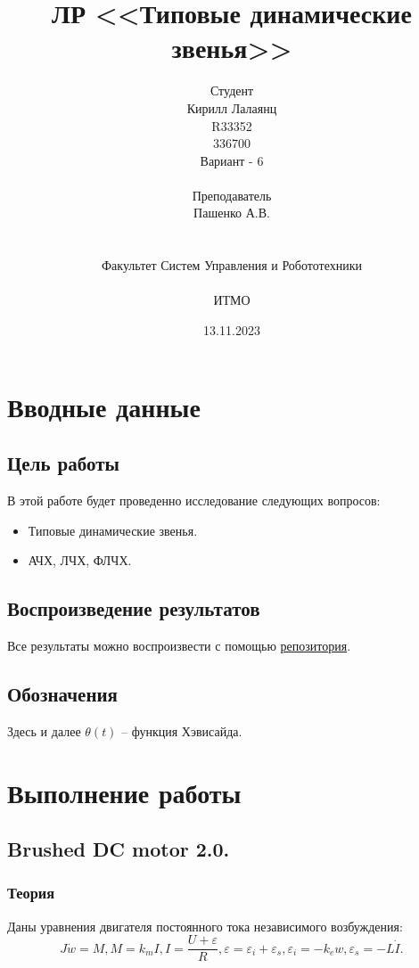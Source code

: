 \documentclass[16pt]{article}
\title{ЛР \textnumero 5 <<Типовые динамические звенья>>}
\author{
Студент \\
Кирилл Лалаянц\\
R33352\\
336700\\
Вариант - 6\\
\\
Преподаватель\\
Пашенко А.В. \\
\\
\\
Факультет Систем Управления и Робототехники\\
\\
ИТМО\\
}
\date{13.11.2023}
\begin{document}
\maketitle
\newpage
\tableofcontents
\thispagestyle{empty}

\newpage
\setcounter{page}{1}
\section{Вводные данные}
\subsection{Цель работы}
В этой работе будет проведенно исследование следующих вопросов:
\begin{itemize}
    \item Типовые динамические звенья.
    \item АЧХ, ЛЧХ, ФЛЧХ.
\end{itemize} 

\subsection{Воспроизведение результатов}
Все результаты можно воспроизвести с помощью \href{https://github.com/lalayants/control-theory-itmo-2023}{репозитория}.

\subsection{Обозначения}
Здесь и далее \(\theta(t)\) -- функция Хэвисайда.

\newpage
\section{Выполнение работы}
\label{sec:headings}


\subsection{Brushed DC motor 2.0.}

\subsubsection{Теория}
Даны уравнения двигателя постоянного тока независимого возбуждения:
\[J\dot{w} = M, M = k_mI, I = \frac{U + \varepsilon}{R}, \varepsilon = \varepsilon_i + \varepsilon_s, \varepsilon_i = -k_ew, \varepsilon_s=-L\dot{I}.\]
\end{document}

